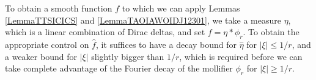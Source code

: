 \documentclass[12pt,reqno]{article}
\numberwithin{equation}{section}
\DeclareMathOperator{\ZZ}{\mathbf{Z}}
\DeclareMathOperator{\TT}{\mathbf{T}}
\newtheorem{lemma}[theorem]{Lemma}
\numberwithin{theorem}{section}
\begin{document}
To obtain a smooth function $f$ to which we can apply Lemmas \ref{LemmaTTSICICS} and \ref{LemmaTAOIAWOIDJ12301}, we take a measure $\eta$, which is a linear combination of Dirac deltas, and set $f = \eta * \phi_r$. To obtain the appropriate control on $\widehat{f}$, it suffices to have a decay bound for $\widehat{\eta}$ for $|\xi| \leq 1/r$, and a weaker bound for $|\xi|$ slightly bigger than $1/r$, which is required before we can take complete advantage of the Fourier decay of the mollifier $\phi_r$ for $|\xi| \geq 1/r$.

\begin{comment}

\begin{lemma} \label{Lemma65493}
    Fix $C > 0$, $r,\varepsilon_1 > 0$, and $\beta \in (0,d/2]$. Consider $K$ points $x_1, \dots, x_K \in \TT^d$ such that for each $\xi \in \ZZ^d$ with $0 < |\xi| \leq 1/r^{1+\varepsilon_1}$,
    \begin{equation} \label{equationOIJDOIJIO}
        \left| \frac{1}{K} \sum_{i = 1}^K e^{2 \pi i x_i \cdot \xi} \right| \leq C |\xi|^{-\beta}.
    \end{equation}
    Then if we define
    \[ f(x) = \frac{1}{K} \sum_{i = 1}^K \phi_{r}(x - x_i), \]
    then $\| f \|_{M(\beta-\varepsilon_1)} \lesssim_{d,\varepsilon_1} C$.
\end{lemma}
\begin{proof}
    Set
    \[ D(x) = \frac{1}{K} \sum_{i = 1}^K \delta(x - x_i), \]
    then \eqref{equationOIJDOIJIO} is equivalent to the property that for each $\xi \in \ZZ^d$ with $0 < |\xi| \leq 1/r^{1 + \varepsilon_1}$,
    \begin{equation} \label{equationFFOSOXPFFGHI}
        |\widehat{D}(\xi)| \leq C |\xi|^{-\beta}.
    \end{equation}
    Noting that $f = D * \phi_{r}$, we conclude that
    \begin{equation} \label{equation6666GGCIS}
        |\widehat{f}| = |\widehat{D}| |\widehat{\phi_{r}}|.
    \end{equation}
    For $0 < |\xi| \leq 1/r^{1 + \varepsilon_1}$, we combine \eqref{equationFFOSOXPFFGHI}, \eqref{equation6666GGCIS} and \eqref{equationDIOJAOIJVIV23242} to conclude that
    \begin{equation} \label{equationGGIOHISI99234}
        |\widehat{f}(\xi)| \leq C |\xi|^{-\beta} \leq C |\xi|^{\varepsilon_1 - \beta}.
    \end{equation}
    For $|\xi| \geq 1/r^{1 + \varepsilon_1}$, we note that \eqref{molificationdecaybound} implies $\widehat{\phi_{r}}(\xi) \lesssim_T r^{-T} |\xi|^{-T}$, and so if $T \geq \beta$,
    \begin{equation} \label{equationDIICCCJSXVVM21}
        |\widehat{f}(\xi)| \lesssim_T [r^{-T} |\xi|^{\beta-T}] |\xi|^{-\beta} \leq [r^{-T} r^{-(1+\varepsilon_1)(\beta-T)}] |\xi|^{-\beta} \leq r^{-(1+\varepsilon_1) \beta + \varepsilon_1 T} |\xi|^{-\beta}.
    \end{equation}
    Setting $T = (1 + 1/\varepsilon_1) \cdot \beta$ gives $|\widehat{f}(\xi)| \lesssim_{\varepsilon_1,d} |\xi|^{-\beta}$.
\end{proof}


\end{comment}
\end{document}
